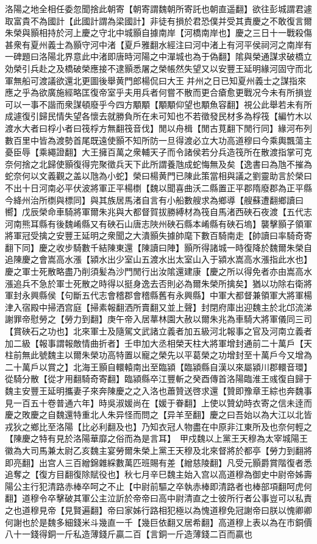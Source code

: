 洛陽之地全相任委忽聞捨此朝寄【朝寄謂魏朝所寄託也朝直遥翻】欲往彭城謂君遽取富貴不為國計【此國計謂為梁國計】非徒有損於君恐僕并受其責慶之不敢復言爾朱榮與顥相持於河上慶之守北中城顥自據南岸【河橋南岸也】慶之三日十一戰殺傷甚衆有夏州義士為顥守河中渚【夏戶雅翻水經注曰河中渚上有河平侯祠河之南岸有一碑題曰洛陽北界意此中渚即唐時河陽之中潬城也為于偽翻】隂與榮通謀求破橋立効榮引兵赴之及橋破榮應接不逮顥悉屠之榮帳然失望又以安豐王延明緣河固守而北軍無船可渡議欲還北更圖後舉黄門郎楊侃曰大王并州之日已知夏州義士之謀指來應之乎為欲廣施經略匡復帝室乎夫用兵者何嘗不散而更合瘡愈更戰况今未有所損豈可以一事不諧而衆謀頓廢乎今四方顒顒【顒顒仰望也顒魚容翻】視公此舉若未有所成遽復引歸民情失望各懷去就勝負所在未可知也不若徵發民材多為桴筏【編竹木以渡水大者曰桴小者曰筏桴方無翻筏音伐】閒以舟楫【閒古莧翻下閒行同】緣河布列數百里中皆為渡勢首尾既遠使顥不知所防一旦得渡必立大功高道穆曰今乘輿飄蕩主憂臣辱【乘繩證翻】大王擁百萬之衆輔天子而令諸侯若分兵造筏所在散渡指掌可克奈何捨之北歸使顥復得完聚徵兵天下此所謂養虺成蛇悔無及矣【逸書曰為虺不摧為蛇奈何以文義觀之盖以虺為小蛇】榮曰楊黄門已陳此策當相與議之劉靈助言於榮曰不出十日河南必平伏波將軍正平楊檦【魏以聞喜曲沃二縣置正平郡隋廢郡為正平縣今絳州治所檦與標同】與其族居馬渚自言有小船數艘求為鄉導【艘蘇遭翻鄉讀曰嚮】戊辰榮命車騎將軍爾朱兆與大都督賀拔勝縛材為筏自馬渚西硤石夜渡【五代志河南熊耳縣有後魏崤縣又有硤石山唐志陜州硤石縣本崤縣有硤石塢】襲擊顥子領軍將軍冠受擒之安豐王延明之衆聞之大潰顥失據帥麾下數百騎南走【帥讀曰率騎奇寄翻下同】慶之收步騎數千結陳東還【陳讀曰陣】顥所得諸城一時復降於魏爾朱榮自追陳慶之會嵩高水漲【潁水出少室山五渡水出太室山入于潁水嵩高水漲指此水也】慶之軍士死散略盡乃削須髪為沙門閒行出汝隂還建康【慶之所以得免者亦由嵩高水漲追兵不急於軍士死散之時得以挺身逸去否則必為爾朱榮所擒矣】猶以功除右衛將軍封永興縣侯【句斷五代志會稽郡會稽縣舊有永興縣】中軍大都督兼領軍大將軍楊津入宿殿中掃洒宫庭【掃素報翻洒所賣翻又並上聲】封閉府庫出迎魏主於北邙流涕謝罪帝慰勞之【勞力到翻】庚午帝入居蕐林園大赦以爾朱兆為車騎大將軍儀同三司【賞硤石之功也】北來軍士及隨駕文武諸立義者加五級河北報事之官及河南立義者加二級【報事謂報敵情曲折者】壬申加大丞相榮天柱大將軍增封通前二十萬戶【天柱前無此號魏主以爾朱榮功高特置以寵之榮先以平葛榮之功增封至十萬戶今又增為二十萬戶以賞之】北海王顥自轘轅南出至臨潁【臨潁縣自漢以來屬潁川郡轘音環】從騎分散【從才用翻騎奇寄翻】臨潁縣卒江豐斬之癸酉傳首洛陽臨淮王彧復自歸于魏主安豐王延明攜妻子來奔陳慶之之入洛也蕭贊送啓求還【贊即豫章王綜也奔魏事見一百五十卷普通六年】時吳淑媛尚在【媛于眷翻】上使以贊幼時衣寄之信未逹而慶之敗慶之自魏還特重北人朱异怪而問之【异羊至翻】慶之曰吾始以為大江以北皆戎狄之鄉比至洛陽【比必利翻及也】乃知衣冠人物盡在中原非江東所及也奈何輕之【陳慶之特有見於洛陽華靡之俗而為是言耳】　甲戍魏以上黨王天穆為太宰城陽王徽為大司馬兼太尉乙亥魏主宴勞爾朱榮上黨王天穆及北來督將於都亭【勞力到翻將即亮翻】出宫人三百繒錦雜綵數萬匹班賜有差【繒慈陵翻】凡受元顥爵賞階復者悉追奪之【復方目翻復除賦役也】秋七月辛巳魏主始入宫以高道穆為御史中尉帝姊壽陽公主行犯清路赤棒卒呵之不止【中尉前驅之卒執赤棒即清路者也棒部項翻呵虎何翻】道穆令卒擊破其軍公主泣訢於帝帝曰高中尉清直之士彼所行者公事豈可以私責之也道穆見帝【見賢遍翻】帝曰家姊行路相犯極以為愧道穆免冠謝帝曰朕以愧卿卿何謝也於是魏多細錢米斗幾直一千【幾巨依翻又居希翻】高道穆上表以為在市銅價八十一錢得銅一斤私造薄錢斤贏二百【言銅一斤造薄錢二百而贏也